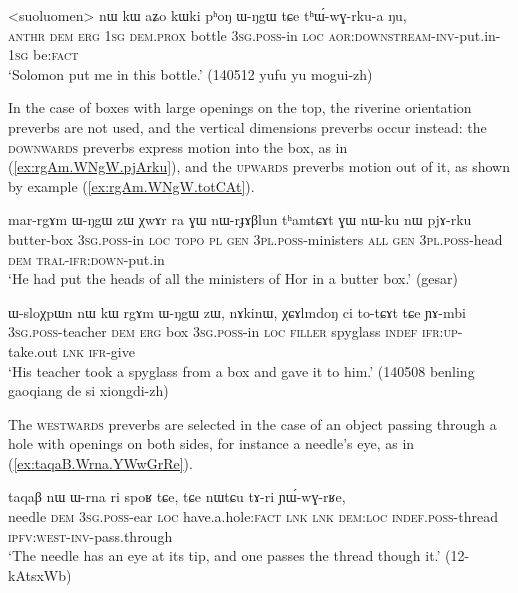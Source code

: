 \begin{exe}
\ex \label{ex:phoN.WNgW.thWwGrkua}
\gll  <suoluomen> nɯ kɯ aʑo kɯki pʰoŋ ɯ-ŋgɯ tɕe tʰɯ́-wɣ-rku-a ŋu,\\
\textsc{anthr} \textsc{dem} \textsc{erg} \textsc{1sg} \textsc{dem}.\textsc{prox} bottle \textsc{3sg}.\textsc{poss}-in \textsc{loc} \textsc{aor}:\textsc{downstream}-\textsc{inv}-put.in-\textsc{1sg} be:\textsc{fact} \\
\glt `Solomon put me in this bottle.' (140512 yufu yu mogui-zh)
\end{exe}

In the case of boxes with large openings on the top, the riverine orientation preverbs are not used, and the vertical dimensions preverbs occur instead: the \textsc{downwards} preverbs express motion into the box, as in (\ref{ex:rgAm.WNgW.pjArku}), and the \textsc{upwards} preverbs motion out of it, as shown by example (\ref{ex:rgAm.WNgW.totCAt}).

\begin{exe}
\ex \label{ex:rgAm.WNgW.pjArku}
\gll mar-rgɤm ɯ-ŋgɯ zɯ χwɤr ra ɣɯ nɯ-rɟɤβlun tʰamtɕɤt ɣɯ nɯ-ku nɯ pjɤ-rku \\
butter-box \textsc{3sg}.\textsc{poss}-in \textsc{loc}  \textsc{topo} \textsc{pl} \textsc{gen} \textsc{3pl}.\textsc{poss}-ministers \textsc{all} \textsc{gen} \textsc{3pl}.\textsc{poss}-head \textsc{dem} \textsc{tral}-\textsc{ifr}:\textsc{down}-put.in \\
\glt `He had put the heads of all the ministers of Hor in a butter box.' (gesar)
\end{exe}

\begin{exe}
\ex \label{ex:rgAm.WNgW.totCAt}
\gll ɯ-sloχpɯn nɯ kɯ rgɤm ɯ-ŋgɯ zɯ, nɤkinɯ, χɕɤlmdoŋ ci to-tɕɤt tɕe ɲɤ-mbi \\
\textsc{3sg}.\textsc{poss}-teacher \textsc{dem} \textsc{erg} box \textsc{3sg}.\textsc{poss}-in \textsc{loc} \textsc{filler} spyglass \textsc{indef} \textsc{ifr}:\textsc{up}-take.out \textsc{lnk} \textsc{ifr}-give \\
\glt `His teacher took a spyglass from a box and gave it to him.' (140508 benling gaoqiang de si xiongdi-zh)
\end{exe}

The \textsc{westwards} preverbs are selected in the case of an object passing through a hole with openings on both sides, for instance a needle's eye, as in (\ref{ex:taqaB.Wrna.YWwGrRe}).

\begin{exe}
\ex \label{ex:taqaB.Wrna.YWwGrRe}
\gll taqaβ nɯ ɯ-rna ri spoʁ tɕe, tɕe nɯtɕu tɤ-ri ɲɯ́-wɣ-rʁe, \\
needle \textsc{dem} \textsc{3sg}.\textsc{poss}-ear \textsc{loc} have.a.hole:\textsc{fact} \textsc{lnk} \textsc{lnk} \textsc{dem}:\textsc{loc} \textsc{indef}.\textsc{poss}-thread \textsc{ipfv}:\textsc{west}-\textsc{inv}-pass.through \\
\glt `The needle has an eye at its tip, and one passes the thread though it.' (12-kAtsxWb) 
\end{exe}

